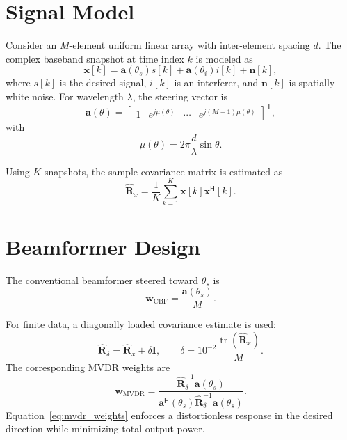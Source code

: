 \documentclass[conference]{IEEEtran}
\begin{document}
\section{Signal Model}
Consider an $M$-element uniform linear array with inter-element spacing $d$. The complex baseband snapshot at time index $k$ is modeled as
\begin{equation}
\mathbf{x}[k]
=
\mathbf{a}(\theta_s)s[k]
+
\mathbf{a}(\theta_i)i[k]
+
\mathbf{n}[k],
\label{eq:snapshot_model}
\end{equation}
where $s[k]$ is the desired signal, $i[k]$ is an interferer, and $\mathbf{n}[k]$ is spatially white noise. For wavelength $\lambda$, the steering vector is
\begin{equation}
\mathbf{a}(\theta)
=
\begin{bmatrix}
1 & e^{j\mu(\theta)} & \cdots & e^{j(M-1)\mu(\theta)}
\end{bmatrix}^{\mathsf{T}},
\label{eq:steering_vector}
\end{equation}
with
\begin{equation}
\mu(\theta)=2\pi\frac{d}{\lambda}\sin\theta.
\label{eq:spatial_frequency}
\end{equation}

Using $K$ snapshots, the sample covariance matrix is estimated as \cite{krim1996,stoica2005}
\begin{equation}
\widehat{\mathbf{R}}_x
=
\frac{1}{K}
\sum_{k=1}^{K}
\mathbf{x}[k]\mathbf{x}^{\mathsf{H}}[k].
\label{eq:sample_covariance}
\end{equation}

\section{Beamformer Design}
The conventional beamformer steered toward $\theta_s$ is
\begin{equation}
\mathbf{w}_{\mathrm{CBF}}
=
\frac{\mathbf{a}(\theta_s)}{M}.
\label{eq:cbf_weights}
\end{equation}

For finite data, a diagonally loaded covariance estimate is used:
\begin{equation}
\widehat{\mathbf{R}}_{\delta}
=
\widehat{\mathbf{R}}_x+\delta\mathbf{I},
\qquad
\delta=10^{-2}\frac{\operatorname{tr}(\widehat{\mathbf{R}}_x)}{M}.
\label{eq:diagonal_loading}
\end{equation}
The corresponding MVDR weights are
\begin{equation}
\mathbf{w}_{\mathrm{MVDR}}
=
\frac{\widehat{\mathbf{R}}_{\delta}^{-1}\mathbf{a}(\theta_s)}
{\mathbf{a}^{\mathsf{H}}(\theta_s)
\widehat{\mathbf{R}}_{\delta}^{-1}
\mathbf{a}(\theta_s)}.
\label{eq:mvdr_weights}
\end{equation}
Equation~\eqref{eq:mvdr_weights} enforces a distortionless response in the desired direction while minimizing total output power.
\end{document}
